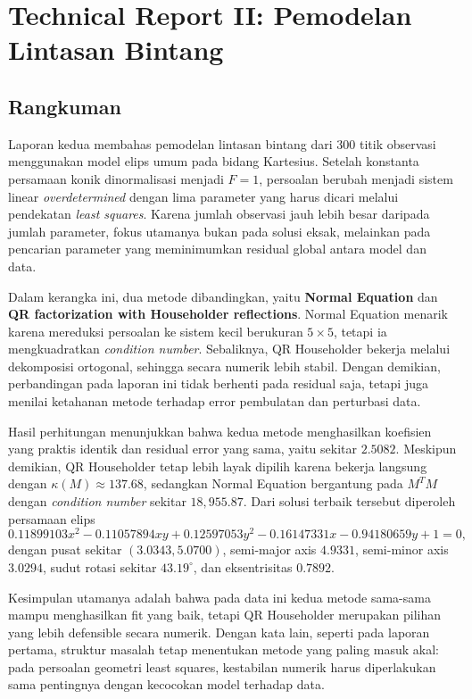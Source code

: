 \documentclass[12pt,a4paper]{article}
\begin{document}
\clearpage
\section*{Technical Report II: Pemodelan Lintasan Bintang}

\subsection*{Rangkuman}
Laporan kedua membahas pemodelan lintasan bintang dari 300 titik observasi menggunakan model elips umum pada bidang Kartesius. Setelah konstanta persamaan konik dinormalisasi menjadi $F=1$, persoalan berubah menjadi sistem linear \emph{overdetermined} dengan lima parameter yang harus dicari melalui pendekatan \emph{least squares}. Karena jumlah observasi jauh lebih besar daripada jumlah parameter, fokus utamanya bukan pada solusi eksak, melainkan pada pencarian parameter yang meminimumkan residual global antara model dan data.

Dalam kerangka ini, dua metode dibandingkan, yaitu \textbf{Normal Equation} dan \textbf{QR factorization with Householder reflections}. Normal Equation menarik karena mereduksi persoalan ke sistem kecil berukuran $5\times 5$, tetapi ia mengkuadratkan \emph{condition number}. Sebaliknya, QR Householder bekerja melalui dekomposisi ortogonal, sehingga secara numerik lebih stabil. Dengan demikian, perbandingan pada laporan ini tidak berhenti pada residual saja, tetapi juga menilai ketahanan metode terhadap error pembulatan dan perturbasi data.

Hasil perhitungan menunjukkan bahwa kedua metode menghasilkan koefisien yang praktis identik dan residual error yang sama, yaitu sekitar $2.5082$. Meskipun demikian, QR Householder tetap lebih layak dipilih karena bekerja langsung dengan \(\kappa(M)\approx 137.68\), sedangkan Normal Equation bergantung pada \(M^TM\) dengan \emph{condition number} sekitar $18{,}955.87$. Dari solusi terbaik tersebut diperoleh persamaan elips
\[
0.11899103x^2 - 0.11057894xy + 0.12597053y^2 - 0.16147331x - 0.94180659y + 1 = 0,
\]
dengan pusat sekitar $(3.0343, 5.0700)$, semi-major axis $4.9331$, semi-minor axis $3.0294$, sudut rotasi sekitar $43.19^\circ$, dan eksentrisitas $0.7892$.

Kesimpulan utamanya adalah bahwa pada data ini kedua metode sama-sama mampu menghasilkan fit yang baik, tetapi QR Householder merupakan pilihan yang lebih defensible secara numerik. Dengan kata lain, seperti pada laporan pertama, struktur masalah tetap menentukan metode yang paling masuk akal: pada persoalan geometri least squares, kestabilan numerik harus diperlakukan sama pentingnya dengan kecocokan model terhadap data.
\end{document}
